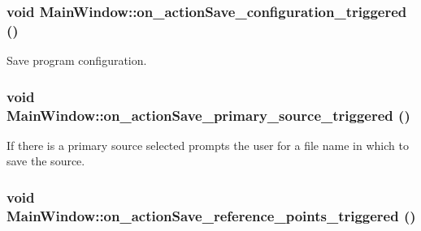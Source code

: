 \hypertarget{class_main_window_d4bdb52229e3a87a86a011875dd92236}{
\subsubsection[{on\_\-actionSave\_\-configuration\_\-triggered}]{\setlength{\rightskip}{0pt plus 5cm}void MainWindow::on\_\-actionSave\_\-configuration\_\-triggered ()}}
\label{class_main_window_d4bdb52229e3a87a86a011875dd92236}


Save program configuration. 

\hypertarget{class_main_window_79b36efc3f54a7c2950a7f51564eede4}{
\subsubsection[{on\_\-actionSave\_\-primary\_\-source\_\-triggered}]{\setlength{\rightskip}{0pt plus 5cm}void MainWindow::on\_\-actionSave\_\-primary\_\-source\_\-triggered ()}}
\label{class_main_window_79b36efc3f54a7c2950a7f51564eede4}


If there is a primary source selected prompts the user for a file name in which to save the source. 

\hypertarget{class_main_window_5043d479476d86d34de793756dee7f90}{
\subsubsection[{on\_\-actionSave\_\-reference\_\-points\_\-triggered}]{\setlength{\rightskip}{0pt plus 5cm}void MainWindow::on\_\-actionSave\_\-reference\_\-points\_\-triggered ()}}
\label{class_main_window_5043d479476d86d34de793756dee7f90}


